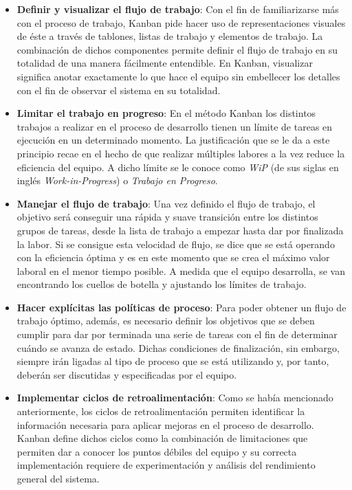 \begin{itemize}
    \item \textbf{Definir y visualizar el flujo de trabajo}: %
    Con el fin de familiarizarse más con el proceso de trabajo, Kanban pide
    hacer uso de representaciones visuales de éste a través de tablones, listas
    de trabajo y elementos de trabajo. La combinación de dichos componentes
    permite definir el flujo de trabajo en su totalidad de una manera fácilmente
    entendible. En Kanban, visualizar significa anotar exactamente lo que hace
    el equipo sin embellecer los detalles con el fin de observar el sistema en
    su totalidad.

    \item \textbf{Limitar el trabajo en progreso}: %
    En el método Kanban los distintos trabajos a realizar en el proceso de
    desarrollo tienen un límite de tareas en ejecución en un determinado
    momento. La justificación que se le da a este principio recae en el hecho de
    que realizar múltiples labores a la vez reduce la eficiencia del equipo. A
    dicho límite se le conoce como \emph{WiP} (de sus siglas en inglés
    \emph{Work-in-Progress}) o \emph{Trabajo en Progreso}.

    \item \textbf{Manejar el flujo de trabajo}: %
    Una vez definido el flujo de trabajo, el objetivo será conseguir una rápida
    y suave transición entre los distintos grupos de tareas, desde la lista de
    trabajo a empezar hasta dar por finalizada la labor. Si se consigue esta
    velocidad de flujo, se dice que se está operando con la eficiencia óptima y
    es en este momento que se crea el máximo valor laboral en el menor tiempo
    posible. A medida que el equipo desarrolla, se van encontrando los cuellos
    de botella y ajustando los límites de trabajo.

    \item \textbf{Hacer explícitas las políticas de proceso}: %
    Para poder obtener un flujo de trabajo óptimo, además, es necesario definir
    los objetivos que se deben cumplir para dar por terminada una serie de
    tareas con el fin de determinar cuándo se avanza de estado. Dichas
    condiciones de finalización, sin embargo, siempre irán ligadas al tipo de
    proceso que se está utilizando y, por tanto, deberán ser discutidas y
    especificadas por el equipo.

    \item \textbf{Implementar ciclos de retroalimentación}: %
    Como se había mencionado anteriormente, los ciclos de retroalimentación
    permiten identificar la información necesaria para aplicar mejoras en el
    proceso de desarrollo. Kanban define dichos ciclos como la combinación de
    limitaciones que permiten dar a conocer los puntos débiles del equipo y su
    correcta implementación requiere de experimentación y análisis del
    rendimiento general del sistema.


\end{itemize}
